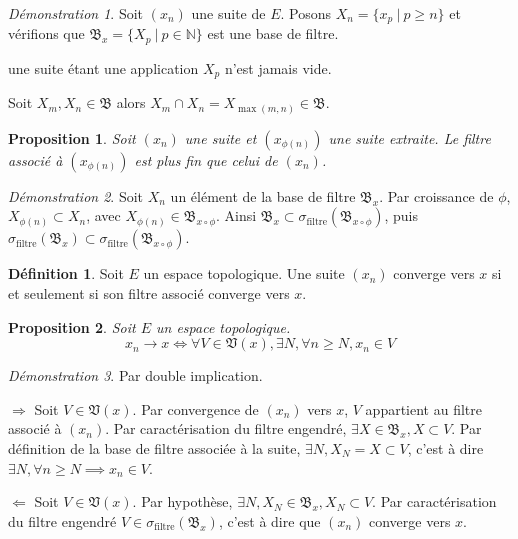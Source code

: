 \documentclass[a4paper, 11pt, french]{book}
\newenvironment{itemise}{\itemize}{\enditemize}
\theoremstyle{plain} %
\newtheorem{proposition}{Proposition}
\theoremstyle{definition} %
\newtheorem{definition}{Définition}
\theoremstyle{remark} %
\newtheorem*{demonstration}{Démonstration}
\newcommand{\1}{\mathds{1}}
\newcommand{\N}{\mathbb{N}}
\renewcommand{\frak}[1]{\mathfrak{#1}}
\renewcommand{\rm}[1]{\mathrm{#1}}
\newcommand\ens[2]{\{#1 \ |\ #2\}}
\newcommand\equivalence[3]{
	\begin{demonstration}
		#1
		\begin{itemise}
			\item[$\Longrightarrow$] #2
			\item[$\Longleftarrow$] #3
		\end{itemise}
	\end{demonstration}
}
\begin{document}
\begin{demonstration}
	Soit $(x_n)$ une suite de $E$.
	Posons $X_n=\ens{x_p}{p\geqslant n}$ et vérifions que $\frak{B}_x=\ens{X_p}{p\in\N}$ est une base de filtre.
	\begin{itemise}
		\item une suite étant une application $X_p$ n'est jamais vide.
		\item Soit $X_m, X_n\in\frak{B}$ alors $X_m\cap X_n=X_{\max(m, n)}\in\frak{B}$.
	\end{itemise}
\end{demonstration}

\begin{proposition}
	Soit $(x_n)$ une suite et $(x_{\phi(n)})$ une suite extraite.
	Le filtre associé à $(x_{\phi(n)})$ est plus fin que celui de $(x_n)$.
\end{proposition}

\begin{demonstration}
	Soit $X_n$ un élément de la base de filtre $\frak{B}_x$.
	Par croissance de $\phi$, $X_{\phi(n)}\subset X_n$, avec $X_{\phi(n)}\in\frak{B}_{x\circ\phi}$.
	Ainsi $\frak{B}_x\subset\sigma_\rm{filtre}(\frak{B}_{x\circ\phi})$, puis $\sigma_\rm{filtre}(\frak{B}_x)\subset\sigma_\rm{filtre}(\frak{B}_{x\circ\phi})$.
\end{demonstration}

\begin{definition}
	Soit $E$ un espace topologique.
	Une suite $(x_n)$ converge vers $x$ si et seulement si son filtre associé converge vers $x$.
\end{definition}

\begin{proposition}
	Soit $E$ un espace topologique.
	$$
	x_n\rightarrow x
	\iff
	\forall V\in\frak{V}(x), \exists N, \forall n\geqslant N, x_n\in V
	$$
\end{proposition}

\equivalence{Par double implication.}{
	Soit $V\in\frak{V}(x)$.
	Par convergence de $(x_n)$ vers $x$, $V$ appartient au filtre associé à $(x_n)$.
	Par caractérisation du filtre engendré, $\exists X\in\frak{B}_x, X\subset V$.
	Par définition de la base de filtre associée à la suite, $\exists N, X_N=X\subset V$, c'est à dire $\exists N, \forall n\geqslant N\implies x_n\in V$.
}{
	Soit $V\in\frak{V}(x)$.
	Par hypothèse, $\exists N, X_N\in\frak{B}_x, X_N\subset V$.
	Par caractérisation du filtre engendré $V\in\sigma_\rm{filtre}(\frak{B}_x)$, c'est à dire que $(x_n)$ converge vers $x$.	
}
\end{document}
